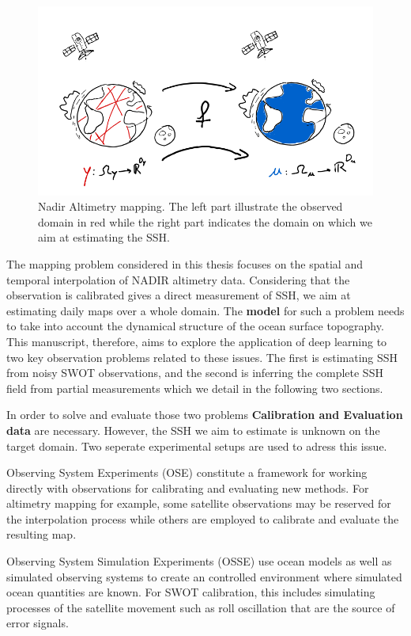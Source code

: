 \begin{bibunit}
\begin{figure}
    \centering
          \includegraphics[width=\linewidth]{Introduction/pics/mapping_task.png}
    \caption{Nadir Altimetry mapping. The left part illustrate the observed domain in red while the right part indicates the domain on which we aim at estimating the SSH.}
    \label{fig:mapping_task}
\end{figure}
The mapping problem considered in this thesis focuses on the spatial and temporal interpolation of NADIR altimetry data. Considering that the observation is calibrated gives a direct measurement of SSH, we aim at estimating daily maps over a whole domain. The \textbf{model} for such a problem needs to take into account the dynamical structure of the ocean surface topography.
This manuscript, therefore, aims to explore the application of deep learning to two key observation problems related to these issues. The first is estimating SSH from noisy SWOT observations, and the second is inferring the complete SSH field from partial measurements which we detail in the following two sections.
  


In order to solve and evaluate those two problems \textbf{Calibration and Evaluation data} are necessary. However, the SSH we aim to estimate is unknown on the target domain.
Two seperate experimental setups are used to adress this issue.

Observing System Experiments (OSE)\cite{} constitute a framework for working directly with observations for calibrating and evaluating new methods.
For altimetry mapping for example, some satellite observations may be reserved for the interpolation process while others are employed to calibrate and evaluate the resulting map.

Observing System Simulation Experiments (OSSE)\cite{} use ocean models as well as simulated observing systems to create an controlled environment where simulated ocean quantities are known. For SWOT calibration, this includes simulating processes of the satellite movement such as roll oscillation that are the source of error signals\cite{}.



\end{bibunit}
